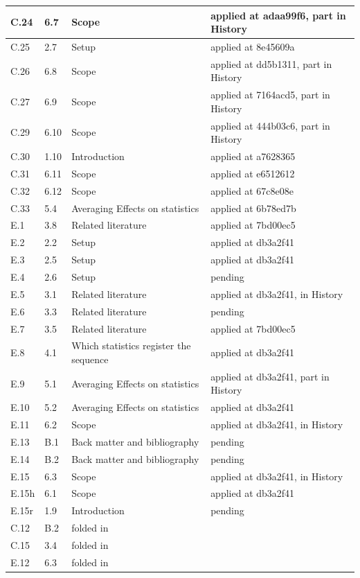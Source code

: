 \documentclass[10pt]{article}
\theoremstyle{definition}
\begin{document}
{\begin{longtable}{|p{2.2cm}|p{2.2cm}|p{9cm}|p{4cm}|}
C.24 & 6.7 & Scope & applied at adaa99f6, part in History \\ \hline
C.25 & 2.7 & Setup & applied at 8e45609a \\ \hline
C.26 & 6.8 & Scope & applied at dd5b1311, part in History \\ \hline
C.27 & 6.9 & Scope & applied at 7164acd5, part in History \\ \hline
C.29 & 6.10 & Scope & applied at 444b03c6, part in History \\ \hline
C.30 & 1.10 & Introduction & applied at a7628365 \\ \hline
C.31 & 6.11 & Scope & applied at e6512612 \\ \hline
C.32 & 6.12 & Scope & applied at 67c8e08e \\ \hline
C.33 & 5.4 & Averaging Effects on statistics & applied at 6b78ed7b \\ \hline
E.1 & 3.8 & Related literature & applied at 7bd00ec5 \\ \hline
E.2 & 2.2 & Setup & applied at db3a2f41 \\ \hline
E.3 & 2.5 & Setup & applied at db3a2f41 \\ \hline
E.4 & 2.6 & Setup & pending \\ \hline
E.5 & 3.1 & Related literature & applied at db3a2f41, in History \\ \hline
E.6 & 3.3 & Related literature & pending \\ \hline
E.7 & 3.5 & Related literature & applied at 7bd00ec5 \\ \hline
E.8 & 4.1 & Which statistics register the sequence & applied at db3a2f41 \\ \hline
E.9 & 5.1 & Averaging Effects on statistics & applied at db3a2f41, part in History \\ \hline
E.10 & 5.2 & Averaging Effects on statistics & applied at db3a2f41 \\ \hline
E.11 & 6.2 & Scope & applied at db3a2f41, in History \\ \hline
E.13 & B.1 & Back matter and bibliography & pending \\ \hline
E.14 & B.2 & Back matter and bibliography & pending \\ \hline
E.15 & 6.3 & Scope & applied at db3a2f41, in History \\ \hline
E.15h & 6.1 & Scope & applied at db3a2f41 \\ \hline
E.15r & 1.9 & Introduction & pending \\ \hline
C.12 & B.2 & folded in & \\ \hline
C.15 & 3.4 & folded in & \\ \hline
E.12 & 6.3 & folded in & \\ \hline
\end{longtable}
}



\end{document}
